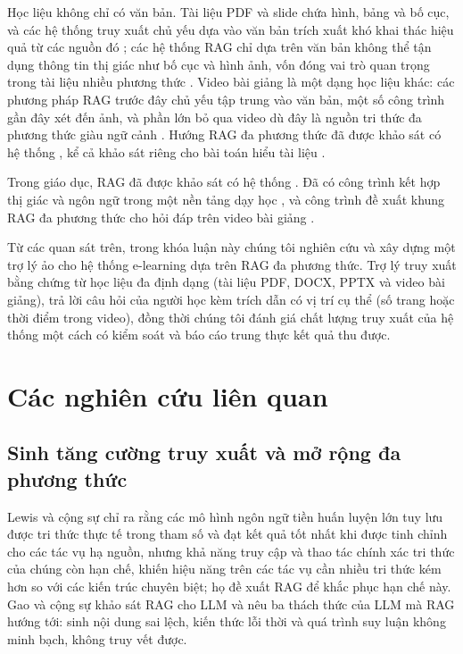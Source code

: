 \bigbreak\noindent
Học liệu không chỉ có văn bản. Tài liệu PDF và slide chứa hình, bảng và bố cục, và các hệ thống truy xuất chủ yếu dựa vào văn bản trích xuất khó khai thác hiệu quả từ các nguồn đó \cite{faysse2025colpali}; các hệ thống RAG chỉ dựa trên văn bản không thể tận dụng thông tin thị giác như bố cục và hình ảnh, vốn đóng vai trò quan trọng trong tài liệu nhiều phương thức \cite{yu2025visrag}. Video bài giảng là một dạng học liệu khác: các phương pháp RAG trước đây chủ yếu tập trung vào văn bản, một số công trình gần đây xét đến ảnh, và phần lớn bỏ qua video dù đây là nguồn tri thức đa phương thức giàu ngữ cảnh \cite{jeong2025videorag}. Hướng RAG đa phương thức đã được khảo sát có hệ thống \cite{abootorabi2025ask}, kể cả khảo sát riêng cho bài toán hiểu tài liệu \cite{gao2026scaling}.

\bigbreak\noindent
Trong giáo dục, RAG đã được khảo sát có hệ thống \cite{li2025ragedu}. Đã có công trình kết hợp thị giác và ngôn ngữ trong một nền tảng dạy học \cite{gokhman2025vlrag}, và công trình đề xuất khung RAG đa phương thức cho hỏi đáp trên video bài giảng \cite{tanner2025lecture}.

\bigbreak\noindent
Từ các quan sát trên, trong khóa luận này chúng tôi nghiên cứu và xây dựng một trợ lý ảo cho hệ thống e-learning dựa trên RAG đa phương thức. Trợ lý truy xuất bằng chứng từ học liệu đa định dạng (tài liệu PDF, DOCX, PPTX và video bài giảng), trả lời câu hỏi của người học kèm trích dẫn có vị trí cụ thể (số trang hoặc thời điểm trong video), đồng thời chúng tôi đánh giá chất lượng truy xuất của hệ thống một cách có kiểm soát và báo cáo trung thực kết quả thu được.


\section{Các nghiên cứu liên quan}

\subsection{Sinh tăng cường truy xuất và mở rộng đa phương thức}

Lewis và cộng sự \cite{lewis2020rag} chỉ ra rằng các mô hình ngôn ngữ tiền huấn luyện lớn tuy lưu được tri thức thực tế trong tham số và đạt kết quả tốt nhất khi được tinh chỉnh cho các tác vụ hạ nguồn, nhưng khả năng truy cập và thao tác chính xác tri thức của chúng còn hạn chế, khiến hiệu năng trên các tác vụ cần nhiều tri thức kém hơn so với các kiến trúc chuyên biệt; họ đề xuất RAG để khắc phục hạn chế này. Gao và cộng sự \cite{gao2023ragsurvey} khảo sát RAG cho LLM và nêu ba thách thức của LLM mà RAG hướng tới: sinh nội dung sai lệch, kiến thức lỗi thời và quá trình suy luận không minh bạch, không truy vết được.

